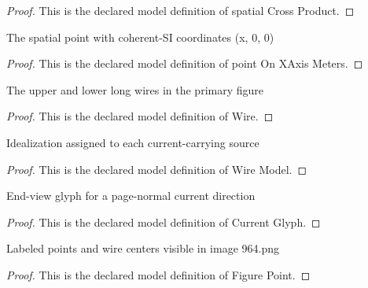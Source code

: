 \begin{proof}
  This is the declared model definition of spatial Cross Product.
\end{proof}
\begin{definition}
  \label{def:physics:phyx-mini-0964:phyxminiproblems-problemphyxmini0964-pointonxaxismeters}
  The spatial point with coherent-SI coordinates (x, 0, 0)
\end{definition}
\begin{proof}
  This is the declared model definition of point On XAxis Meters.
\end{proof}
\begin{definition}[Wire]
  \label{def:physics:phyx-mini-0964:phyxminiproblems-problemphyxmini0964-wire}
  The upper and lower long wires in the primary figure
\end{definition}
\begin{proof}
  This is the declared model definition of Wire.
\end{proof}
\begin{definition}
  \label{def:physics:phyx-mini-0964:phyxminiproblems-problemphyxmini0964-wiremodel}
  Idealization assigned to each current-carrying source
\end{definition}
\begin{proof}
  This is the declared model definition of Wire Model.
\end{proof}
\begin{definition}
  \label{def:physics:phyx-mini-0964:phyxminiproblems-problemphyxmini0964-currentglyph}
  End-view glyph for a page-normal current direction
\end{definition}
\begin{proof}
  This is the declared model definition of Current Glyph.
\end{proof}
\begin{definition}
  \label{def:physics:phyx-mini-0964:phyxminiproblems-problemphyxmini0964-figurepoint}
  Labeled points and wire centers visible in image 964.png
\end{definition}
\begin{proof}
  This is the declared model definition of Figure Point.
\end{proof}
